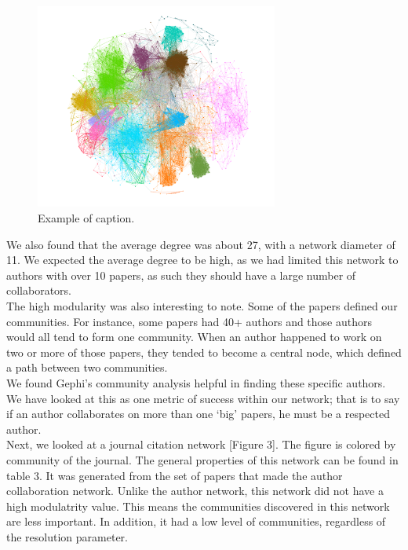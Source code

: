 \documentclass[times, 10pt,twocolumn]{article}
\begin{document}
\begin{figure}[h]
   \includegraphics[width=8cm]{figure2.png}
   \caption{Example of caption.}
\end{figure}

We also found that the average degree was about 27, with a network diameter of 11. We expected the average degree to be high, as we had limited this network to authors with over 10 papers, as such they should have a large number of collaborators. \\

The high modularity was also interesting to note. Some of the papers defined our communities. For instance, some papers had 40+ authors and those authors would all tend to form one community. When an author happened to work on two or more of those papers, they tended to become a central node, which defined a path between two communities. \\

We found Gephi’s community analysis helpful in finding these specific authors. We have looked at this as one metric of success within our network; that is to say if an author collaborates on more than one ‘big’ papers, he must be a respected author. \\

Next, we looked at a journal citation network [Figure 3]. The figure is colored by community of the journal. The general properties of this network can be found in table 3. It was generated from the set of papers that made the author collaboration network. Unlike the author network, this network did not have a high modulatrity value. This means the communities discovered in this network are less important. In addition, it had a low level of communities, regardless of the resolution parameter. \\
\end{document}
